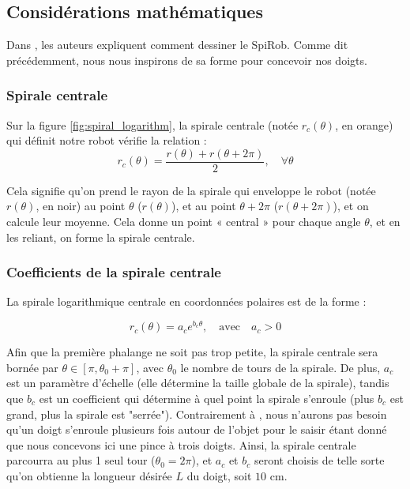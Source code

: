 \documentclass[a4paper, 11pt]{report}
\begin{document}
    \subsection{Considérations mathématiques}

        Dans \cite{wang_spirobs_2025}, les auteurs expliquent comment dessiner le SpiRob. Comme dit précédemment, nous nous inspirons de sa forme pour concevoir nos doigts.

        \subsubsection{Spirale centrale}
            
            Sur la figure \ref{fig:spiral_logarithm}, la spirale centrale (notée $r_c(\theta)$, en orange) qui définit notre robot vérifie la relation :
            \begin{equation}
            r_c(\theta) = \frac{r(\theta) + r(\theta + 2\pi)}{2}, \quad \forall \theta
            \label{eq:spirale_centrale}
            \end{equation}
            
            Cela signifie qu’on prend le rayon de la spirale qui enveloppe le robot (notée $r(\theta)$, en noir) au point $\theta$ ($r(\theta)$), et au point $\theta + 2\pi$ ($r(\theta + 2\pi)$), et on calcule leur moyenne. Cela donne un point « central » pour chaque angle $\theta$, et en les reliant, on forme la spirale centrale. \cite{wang_spirobs_2025}

        \subsubsection{Coefficients de la spirale centrale}
        
            La spirale logarithmique centrale en coordonnées polaires est de la forme :

            \begin{equation}
                r_c(\theta) = a_c e^{b_c \theta}, \quad \text{avec} \quad a_c > 0
                \label{eq:spirale_log}
            \end{equation}

            Afin que la première phalange ne soit pas trop petite, la spirale centrale sera bornée par $\theta \in [\pi, \theta_0 + \pi]$, avec $\theta_0$ le nombre de tours de la spirale. De plus, $a_c$ est un paramètre d’échelle (elle détermine la taille globale de la spirale), tandis que $b_c$ est un coefficient qui détermine à quel point la spirale s’enroule (plus $b_c$ est grand, plus la spirale est "serrée"). Contrairement à \cite{wang_spirobs_2025}, nous n'aurons pas besoin qu'un doigt s'enroule plusieurs fois autour de l'objet pour le saisir étant donné que nous concevons ici une pince à trois doigts. Ainsi, la spirale centrale parcourra au plus 1 seul tour ($\theta_0 = 2\pi$), et $a_c$ et $b_c$ seront choisis de telle sorte qu'on obtienne la longueur désirée $L$ du doigt, soit $10$ cm.
\end{document}
